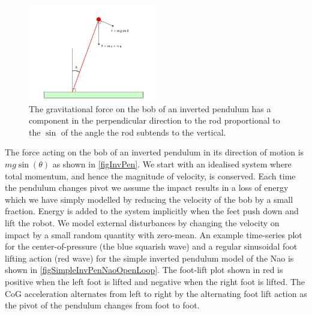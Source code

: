 \documentclass[pdftex,11pt,a4paper]{report}
\begin{document}
\begin{figure}[ht]
\centering
\includegraphics[width=0.5\textwidth]{figures/InvPen.jpg}
\caption{The gravitational force on the bob of an inverted pendulum has a component in the perpendicular direction to the rod proportional to the $\sin$ of the angle the rod subtends to the vertical.} \label{figInvPen}
\end{figure}

The force acting on the bob of an inverted pendulum in its direction of motion is $mg\sin(\theta)$ as shown in \autoref{figInvPen}. We start with an idealised system where total momentum, and hence the magnitude of velocity, is conserved. Each time the pendulum changes pivot we assume the impact results in a loss of energy which we have simply modelled by reducing the velocity of the bob by a small fraction. Energy is added to the system implicitly when the feet push down and lift the robot. We model external disturbances by changing the velocity on impact by a small random quantity with zero-mean. An example time-series plot for the center-of-pressure (the blue squarish wave) and a regular sinusoidal foot lifting action (red wave) for the simple inverted pendulum model of the Nao is shown in \autoref{figSimpleInvPenNaoOpenLoop}. The foot-lift plot shown in red is positive when the left foot is lifted and negative when the right foot is lifted.  The CoG acceleration alternates from left to right by the alternating foot lift action as the pivot of the pendulum changes from foot to foot.   
\end{document}
